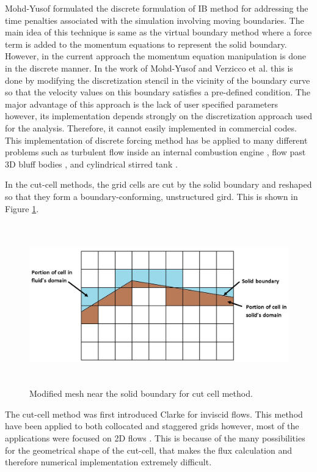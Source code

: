 Mohd-Yusof formulated the discrete formulation of IB method \cite{mohd1997combined} for addressing the time penalties associated with the simulation involving moving boundaries. The main idea of this technique is same as the virtual boundary method where a force term is added to the momentum equations to represent the solid boundary. However, in the current approach the momentum equation manipulation is done in the discrete manner. In the work of Mohd-Yusof \cite{mohd1997combined} and Verzicco et al. \cite{verzicco1998complex} this is done by modifying the discretization stencil in the vicinity of the boundary curve so that the velocity values on this boundary satisfies a pre-defined condition. The major advantage of this approach is the lack of user specified parameters however, its implementation depends strongly on the discretization approach used for the analysis. Therefore, it cannot easily implemented in commercial codes. This implementation of discrete forcing method has be applied to many different problems such as turbulent flow inside an internal combustion engine \cite{verzicco1998complex}, flow past 3D bluff bodies \cite{verzicco2002large}, and cylindrical stirred tank \cite{iaccarino2003immersed}.

In the cut-cell methods, the grid cells are cut by the solid boundary and reshaped so that they form a boundary-conforming, unstructured gird. This is shown in Figure \ref{fig:C1_cutCellMesh}.

\begin{figure}[H]
	\centering
	\includegraphics[height=7.0cm]{Chapter_1/figure/cut_cell_mesh}
	\caption{Modified mesh near the solid boundary for cut cell method.}
	\label{fig:C1_cutCellMesh}
\end{figure}

The cut-cell method was first introduced Clarke \cite{clarke1986euler} for inviscid flows. This method have been applied to both collocated and staggered grids \cite{kirkpatrick2003representation} however, most of the applications were focused on 2D flows \cite{hu2006conservative, udaykumar1999computation}. This is because of the many possibilities for the geometrical shape of the cut-cell, that makes the flux calculation and therefore numerical implementation extremely difficult.

